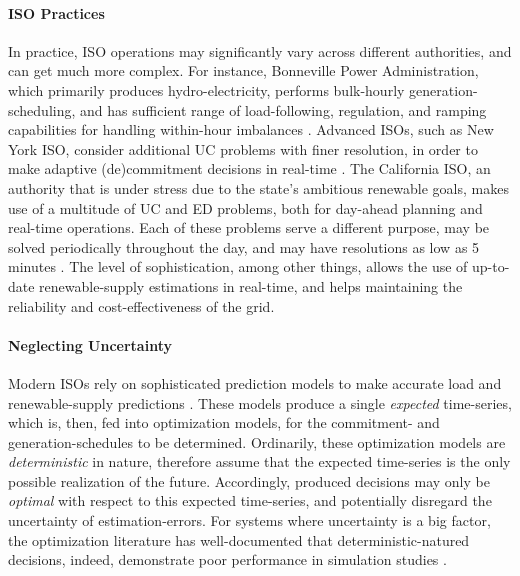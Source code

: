 \documentclass[11pt,a4paper]{article}
\begin{document}
\paragraph{ISO Practices} In practice, ISO operations may significantly vary across different authorities, and can get much more complex. For instance, Bonneville Power Administration, which primarily produces hydro-electricity, performs bulk-hourly generation-scheduling, and has sufficient range of load-following, regulation, and ramping capabilities for handling within-hour imbalances \citep{Makarov2010}. Advanced ISOs, such as New York ISO, consider additional UC problems with finer resolution, in order to make adaptive (de)commitment decisions in real-time \citep{NYISO2017}. The California ISO, an authority that is under stress due to the state's ambitious renewable goals, makes use of a multitude of UC and ED problems, both for day-ahead planning and real-time operations. Each of these problems serve a different purpose, may be solved periodically throughout the day, and may have resolutions as low as 5 minutes \citep{CAISO2017}. The level of sophistication, among other things, allows the use of up-to-date renewable-supply estimations in real-time, and helps maintaining the reliability and cost-effectiveness of the grid.

\paragraph{Neglecting Uncertainty} Modern ISOs rely on sophisticated prediction models to make accurate load and renewable-supply predictions \citep[see, for instance,][]{CAISO2017, NYISO2017}. These models produce a single \textit{expected} time-series, which is, then, fed into optimization models, for the commitment- and generation-schedules to be determined. Ordinarily, these optimization models are \textit{deterministic} in nature, therefore assume that the expected time-series is the only possible realization of the future. Accordingly, produced decisions may only be \textit{optimal} with respect to this expected time-series, and potentially disregard the uncertainty of estimation-errors. For systems where uncertainty is a big factor, the optimization literature has well-documented that deterministic-natured decisions, indeed, demonstrate poor performance in simulation studies \citep[see, for a study on energy-systems,][]{Gangammanavar2016}.

\end{document}
